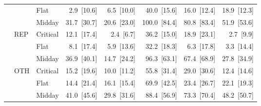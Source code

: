 \begin{tabular}{l l l r r r r r}
 &  & Flat & 2.9~{\color{seasoncol}\scriptsize[10.6]} & 6.5~{\color{seasoncol}\scriptsize[10.0]} & 40.0~{\color{seasoncol}\scriptsize[15.6]} & 16.0~{\color{seasoncol}\scriptsize[12.4]} & 18.9~{\color{seasoncol}\scriptsize[12.3]} \\
 &  & Midday & 31.7~{\color{seasoncol}\scriptsize[30.7]} & 20.6~{\color{seasoncol}\scriptsize[23.0]} & 100.0~{\color{seasoncol}\scriptsize[84.4]} & 80.8~{\color{seasoncol}\scriptsize[83.4]} & 51.9~{\color{seasoncol}\scriptsize[53.6]} \\
 & REP & Critical & 12.1~{\color{seasoncol}\scriptsize[17.4]} & 2.4~{\color{seasoncol}\scriptsize[6.7]} & 36.2~{\color{seasoncol}\scriptsize[15.0]} & 18.9~{\color{seasoncol}\scriptsize[23.1]} & 2.7~{\color{seasoncol}\scriptsize[9.9]} \\
 &  & Flat & 8.1~{\color{seasoncol}\scriptsize[17.4]} & 5.9~{\color{seasoncol}\scriptsize[13.6]} & 32.2~{\color{seasoncol}\scriptsize[18.3]} & 6.3~{\color{seasoncol}\scriptsize[17.8]} & 3.3~{\color{seasoncol}\scriptsize[14.4]} \\
 &  & Midday & 36.9~{\color{seasoncol}\scriptsize[40.1]} & 14.7~{\color{seasoncol}\scriptsize[24.2]} & 96.3~{\color{seasoncol}\scriptsize[63.1]} & 67.4~{\color{seasoncol}\scriptsize[68.9]} & 27.8~{\color{seasoncol}\scriptsize[34.9]} \\
 & OTH & Critical & 15.2~{\color{seasoncol}\scriptsize[19.6]} & 10.0~{\color{seasoncol}\scriptsize[11.2]} & 55.8~{\color{seasoncol}\scriptsize[31.4]} & 29.0~{\color{seasoncol}\scriptsize[30.6]} & 12.4~{\color{seasoncol}\scriptsize[14.6]} \\
 &  & Flat & 14.4~{\color{seasoncol}\scriptsize[21.4]} & 16.1~{\color{seasoncol}\scriptsize[15.4]} & 69.9~{\color{seasoncol}\scriptsize[42.5]} & 23.4~{\color{seasoncol}\scriptsize[26.7]} & 22.1~{\color{seasoncol}\scriptsize[19.3]} \\
 &  & Midday & 41.0~{\color{seasoncol}\scriptsize[45.6]} & 29.8~{\color{seasoncol}\scriptsize[31.6]} & 88.4~{\color{seasoncol}\scriptsize[56.9]} & 73.3~{\color{seasoncol}\scriptsize[70.4]} & 48.2~{\color{seasoncol}\scriptsize[50.7]} \\
\bottomrule
\end{tabular}

